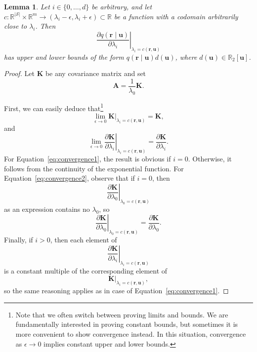 \documentclass{mpaper}
\newtheorem{lemma}[theorem]{Lemma}
\begin{document}
\begin{lemma} \label{lemma:bound1}
  Let $i \in \{ 0, \dots, d \}$ be arbitrary, and let $c \colon
  \mathbb{R}^{|\mathcal{S}|} \times \mathbb{R}^m \to (\lambda_i - \epsilon,
  \lambda_i + \epsilon) \subset \mathbb{R}$ be a function with a codomain
  arbitrarily close to $\lambda_i$. Then
  \[
    \left. \frac{\partial q(\mathbf{r} \mid \mathbf{u})}{\partial \lambda_i}
    \right|_{\lambda_i = c(\mathbf{r}, \mathbf{u})}
  \]
  has upper and lower bounds of the form $q(\mathbf{r} \mid
  \mathbf{u})d(\mathbf{u})$, where $d(\mathbf{u}) \in \mathbb{R}_2[\mathbf{u}]$.
\end{lemma}
\begin{proof}
  Let $\mathbf{K}$ be any covariance matrix and set
  \[
    \mathbf{A} = \frac{1}{\lambda_0} \mathbf{K}.
  \]

  First, we can easily deduce that\footnote{Note that we often switch between
    proving limits and bounds. We are fundamentally interested in proving
    constant bounds, but sometimes it is more convenient to show convergence
    instead. In this situation, convergence as $\epsilon \to 0$ implies constant
    upper and lower bounds.}
  \begin{equation} \label{eq:convergence1}
    \lim_{\epsilon \to 0} \mathbf{K}|_{\lambda_i = c(\mathbf{r}, \mathbf{u})} = \mathbf{K},
  \end{equation}
  and
  \begin{equation} \label{eq:convergence2}
    \lim_{\epsilon \to 0} \left. \frac{\partial \mathbf{K}}{\partial \lambda_i} \right|_{\lambda_i = c(\mathbf{r}, \mathbf{u})} = \frac{\partial \mathbf{K}}{\partial \lambda_i}.
  \end{equation}
  For Equation~\eqref{eq:convergence1}, the result is obvious if $i = 0$.
  Otherwise, it follows from the continuity of the exponential function. For
  Equation~\eqref{eq:convergence2}, observe that if $i=0$, then
  \[
    \left. \frac{\partial \mathbf{K}}{\partial \lambda_0} \right|_{\lambda_0 =
      c(\mathbf{r}, \mathbf{u})}
  \]
  as an expression contains no $\lambda_0$, so
  \[
    \left. \frac{\partial \mathbf{K}}{\partial \lambda_0} \right|_{\lambda_0 =
      c(\mathbf{r}, \mathbf{u})} = \frac{\partial \mathbf{K}}{\partial
      \lambda_0}.
  \]
  Finally, if $i>0$, then each element of 
  \[
    \left. \frac{\partial \mathbf{K}}{\partial \lambda_i}
    \right|_{\lambda_i = c(\mathbf{r}, \mathbf{u})}
  \]
  is a constant multiple of the corresponding element of
  \[
    \mathbf{K}|_{\lambda_i = c(\mathbf{r}, \mathbf{u})},
  \]
  so the same reasoning applies as in case of Equation~\eqref{eq:convergence1}.


\end{proof}
\end{document}
